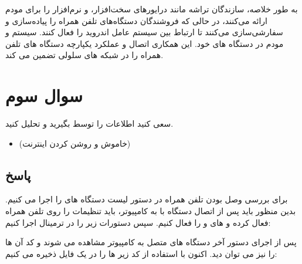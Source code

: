 \documentclass{report}
\begin{document}
به طور خلاصه، سازندگان تراشه مانند درایورهای سخت‌افزار، 
 و نرم‌افزار را برای مودم ارائه می‌کنند، در حالی که فروشندگان دستگاه‌های تلفن همراه
   را پیاده‌سازی و سفارشی‌سازی می‌کنند تا ارتباط بین سیستم عامل اندروید را فعال کنند. سیستم و مودم در دستگاه های خود. این همکاری اتصال و عملکرد یکپارچه دستگاه های تلفن همراه را در شبکه های سلولی تضمین می کند.

\section*{سوال سوم}
سعی کنید اطلاعات
 را توسط
 بگیرید و تحلیل کنید.
\begin{itemize}
	\item 
	 (خاموش و روشن کردن اینترنت)
\end{itemize}
\subsection*{پاسخ}
برای بررسی وصل بودن تلفن همراه در 
دستور لیست دستگاه های
را اجرا می کنیم. بدین منظور باید پس از اتصال دستگاه با 
به کامپیوتر، باید تنظیمات 
را روی تلفن همراه فعال کرده و 
های 
و 
را فعال کنیم. سپس دستورات زیر را در ترمینال اجرا کنیم:
\begin{latin}
	
	\label{code:DeverloperCommands}
\end{latin}
پس از اجرای دستور آخر دستگاه های متصل به کامپیوتر مشاهده می شوند و کد آن ها را نیز می توان دید.
اکنون با استفاده از کد زیر 
ها را در یک فایل 
ذخیره می کنیم:
\begin{latin}
	
	\label{code:LogPrinter}
\end{latin}
\end{document}
